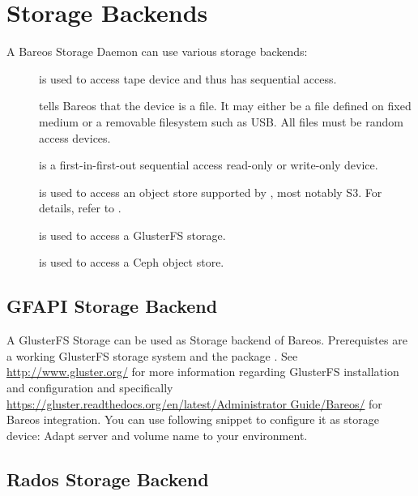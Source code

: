 \chapter{Storage Backends}

A Bareos Storage Daemon can use various storage backends:

\begin{description}
\item [] is used to access tape device and thus has sequential access.
\item []
  tells Bareos that the device is a file. It may either be a
  file defined on fixed medium or a removable filesystem such as
  USB.  All files must be random access devices.
\item [] is a first-in-first-out sequential access read-only
  or write-only device.
\item [] is used to access an object store supported by , most notably S3.
  For details, refer to .
\item [] is used to access a GlusterFS storage.
\item [] is used to access a Ceph object store.
\end{description}





\section{GFAPI Storage Backend}
\label{SdBackendGfapi}


A GlusterFS Storage can be used as Storage backend of Bareos.
Prerequistes are a working GlusterFS storage system and the package .
See \url{http://www.gluster.org/} for more information regarding GlusterFS installation and configuration
and specifically \url{https://gluster.readthedocs.org/en/latest/Administrator Guide/Bareos/}
for Bareos integration.
You can use following snippet to configure it as storage device:
Adapt server and volume name to your environment.




\section{Rados Storage Backend}
\label{SdBackendRados}

